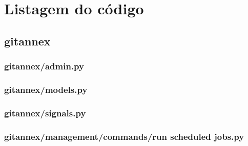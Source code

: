\chapter{Listagem do código}
\label{ApendiceA}

\section{gitannex}



\subsection{gitannex/admin.py}


\subsection{gitannex/models.py}


\subsection{gitannex/signals.py}


\subsection{gitannex/management/commands/run scheduled jobs.py}






